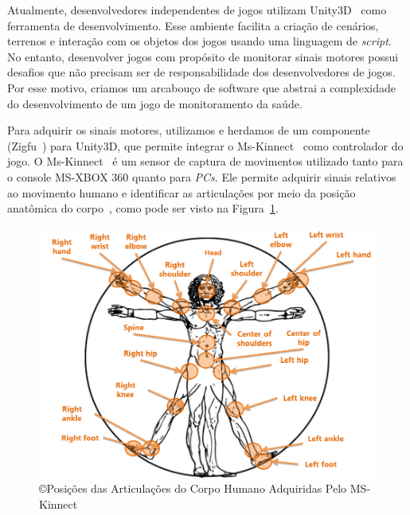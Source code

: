 Atualmente, desenvolvedores independentes de jogos utilizam Unity3D~\cite{unity3d} como ferramenta de desenvolvimento. Esse ambiente facilita a criação de cenários, terrenos e interação com os objetos dos jogos usando uma linguagem de \textit{script}. No entanto, desenvolver jogos com propósito de monitorar sinais motores possui desafios que não precisam ser de responsabilidade dos desenvolvedores de jogos. Por esse motivo, criamos um arcabouço de software que abstrai a complexidade do desenvolvimento de um jogo de monitoramento da saúde.


Para adquirir os sinais motores, utilizamos e herdamos de um componente (Zigfu~\cite{zigfu}) para Unity3D, que permite integrar o Ms-Kinnect~\cite{kinnect2013} como controlador do jogo. O Ms-Kinnect~\cite{kinnect2013} é um sensor de captura de movimentos utilizado tanto para o console MS-XBOX 360 quanto para \textit{PCs}. Ele permite adquirir sinais relativos ao movimento humano e identificar as articulações por meio da posição anatômica do corpo~\cite{hamill1999bases}, como pode ser visto na Figura~\ref{fig:articulacoeskinnect}.





\begin{figure}[!htbp]
 \centering
 \includegraphics[scale=0.4]{./img/articulacoes.png}
\caption[Posições das Articulações do Corpo Humano Adquiridas Pelo MS-Kinnect]{\copyright Posições das Articulações do Corpo Humano Adquiridas Pelo MS-Kinnect ~\cite{kinnect2013}}
 \label{fig:articulacoeskinnect}
\end{figure}


